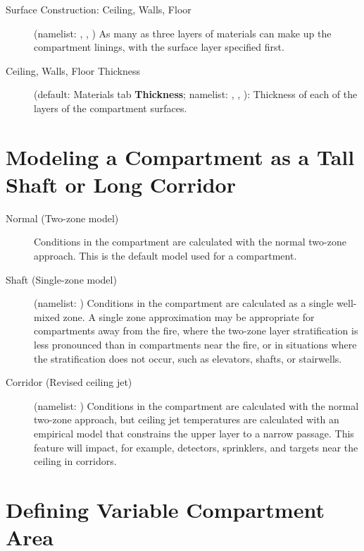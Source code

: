 \begin{description}
\item[Surface Construction: Ceiling, Walls, Floor] (namelist: , , ) As many as three layers of materials can make up the compartment linings, with the surface layer specified first.

\item[Ceiling, Walls, Floor Thickness] (default: Materials tab \textbf{Thickness}; namelist: , , ): Thickness of each of the layers of the compartment surfaces.
\end{description}





\section{Modeling a Compartment as a Tall Shaft or Long Corridor}
\label{info:COMP3}

\begin{description}
\item[Normal (Two-zone model)] Conditions in the compartment are calculated with the normal two-zone approach. This is the default model used for a compartment.

\item[Shaft (Single-zone model)] (namelist: ) Conditions in the compartment are calculated as a single well-mixed zone. A single zone approximation may be appropriate for compartments away from the fire, where the two-zone layer stratification is less pronounced than in compartments near the fire, or in situations where the stratification does not occur, such as elevators, shafts, or stairwells.

\item[Corridor (Revised ceiling jet)] (namelist: ) Conditions in the compartment are calculated with the normal two-zone approach, but ceiling jet temperatures are calculated with an empirical model that constrains the upper layer to a narrow passage. This feature will impact, for example, detectors, sprinklers, and targets near the ceiling in corridors.
\end{description}




\section{Defining Variable Compartment Area}
\label{info:COMP4}

